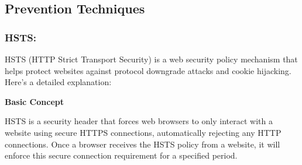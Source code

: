 %
\subsection{Prevention Techniques}
\subsubsection{HSTS:}
HSTS (HTTP Strict Transport Security) is a web security policy mechanism that helps protect websites against protocol downgrade attacks and cookie hijacking. Here's a detailed explanation:

\textbf{Basic Concept}

HSTS is a security header that forces web browsers to only interact with a website using secure HTTPS connections, automatically rejecting any HTTP connections. Once a browser receives the HSTS policy from a website, it will enforce this secure connection requirement for a specified period.

